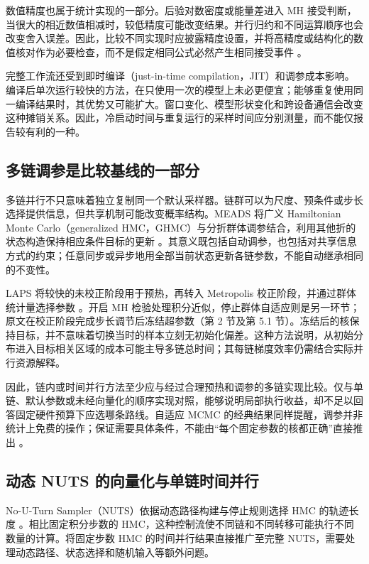 \documentclass[UTF8,a4paper,zihao=-4,fontset=fandol]{ctexart}
\begin{document}
数值精度也属于统计实现的一部分。后验对数密度或能量差进入 MH 接受判断，当很大的相近数值相减时，较低精度可能改变结果。并行归约和不同运算顺序也会改变舍入误差。因此，比较不同实现时应披露精度设置，并将高精度或结构化的数值核对作为必要检查，而不是假定相同公式必然产生相同接受事件 \cite{sountsov2026}。

完整工作流还受到即时编译（just-in-time compilation，JIT）和调参成本影响。编译后单次运行较快的方法，在只使用一次的模型上未必更便宜；能够重复使用同一编译结果时，其优势又可能扩大。窗口变化、模型形状变化和跨设备通信会改变这种摊销关系。因此，冷启动时间与重复运行的采样时间应分别测量，而不能仅报告较有利的一种。

\subsection{多链调参是比较基线的一部分}

多链并行不只意味着独立复制同一个默认采样器。链群可以为尺度、预条件或步长选择提供信息，但共享机制可能改变概率结构。MEADS 将广义 Hamiltonian Monte Carlo（generalized HMC，GHMC）与分折群体调参结合，利用其他折的状态构造保持相应条件目标的更新 \cite{hoffman2022}。其意义既包括自动调参，也包括对共享信息方式的约束；任意同步或异步地用全部当前状态更新各链参数，不能自动继承相同的不变性。

LAPS 将较快的未校正阶段用于预热，再转入 Metropolis 校正阶段，并通过群体统计量选择参数 \cite{robnik2026}。开启 MH 检验处理积分近似，停止群体自适应则是另一环节；原文在校正阶段完成步长调节后冻结超参数（第 2 节及第 5.1 节）。冻结后的核保持目标，并不意味着切换当时的样本立刻无初始化偏差。这种方法说明，从初始分布进入目标相关区域的成本可能主导多链总时间；其每链梯度效率仍需结合实际并行资源解释。

因此，链内或时间并行方法至少应与经过合理预热和调参的多链实现比较。仅与单链、默认参数或未经向量化的顺序实现对照，能够说明局部执行收益，却不足以回答固定硬件预算下应选哪条路线。自适应 MCMC 的经典结果同样提醒，调参并非统计上免费的操作；保证需要具体条件，不能由“每个固定参数的核都正确”直接推出 \cite{roberts2007}。

\subsection{动态 NUTS 的向量化与单链时间并行}

No-U-Turn Sampler（NUTS）依据动态路径构建与停止规则选择 HMC 的轨迹长度 \cite{hoffman2014}。相比固定积分步数的 HMC，这种控制流使不同链和不同转移可能执行不同数量的计算。将固定步数 HMC 的时间并行结果直接推广至完整 NUTS，需要处理动态路径、状态选择和随机输入等额外问题。
\end{document}
